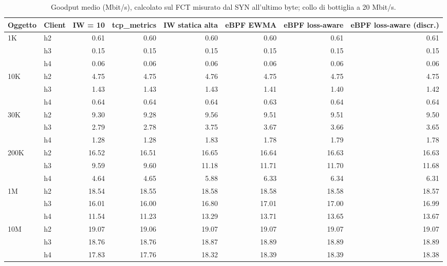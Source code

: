 \begin{table}[htbp]
  \centering
  \caption{Goodput medio (Mbit/s), calcolato sul FCT misurato dal SYN all'ultimo byte; collo di bottiglia a 20 Mbit/s.}
  \label{tab:goodput-20}
  \begin{tabular}{llrrrrrr}
    \toprule
    Oggetto & Client & IW = 10 & tcp\_metrics & IW statica alta & eBPF EWMA & eBPF loss-aware & eBPF loss-aware (discr.) \\
    \midrule
    1K & h2 & 0.61 & 0.60 & 0.60 & 0.60 & 0.61 & 0.61 \\
     & h3 & 0.15 & 0.15 & 0.15 & 0.15 & 0.15 & 0.15 \\
     & h4 & 0.06 & 0.06 & 0.06 & 0.06 & 0.06 & 0.06 \\
    \addlinespace
    10K & h2 & 4.75 & 4.75 & 4.76 & 4.75 & 4.75 & 4.75 \\
     & h3 & 1.43 & 1.43 & 1.43 & 1.41 & 1.40 & 1.42 \\
     & h4 & 0.64 & 0.64 & 0.64 & 0.63 & 0.64 & 0.64 \\
    \addlinespace
    30K & h2 & 9.30 & 9.28 & 9.56 & 9.51 & 9.51 & 9.50 \\
     & h3 & 2.79 & 2.78 & 3.75 & 3.67 & 3.66 & 3.65 \\
     & h4 & 1.28 & 1.28 & 1.83 & 1.78 & 1.79 & 1.78 \\
    \addlinespace
    200K & h2 & 16.52 & 16.51 & 16.65 & 16.64 & 16.63 & 16.63 \\
     & h3 & 9.59 & 9.60 & 11.18 & 11.71 & 11.70 & 11.68 \\
     & h4 & 4.64 & 4.65 & 5.88 & 6.33 & 6.34 & 6.31 \\
    \addlinespace
    1M & h2 & 18.54 & 18.55 & 18.58 & 18.58 & 18.58 & 18.57 \\
     & h3 & 16.01 & 16.00 & 16.80 & 17.01 & 17.00 & 16.99 \\
     & h4 & 11.54 & 11.23 & 13.29 & 13.71 & 13.65 & 13.67 \\
    \addlinespace
    10M & h2 & 19.07 & 19.06 & 19.07 & 19.07 & 19.07 & 19.07 \\
     & h3 & 18.76 & 18.76 & 18.87 & 18.89 & 18.89 & 18.89 \\
     & h4 & 17.83 & 17.76 & 18.32 & 18.39 & 18.39 & 18.38 \\
    \bottomrule
  \end{tabular}
\end{table}
